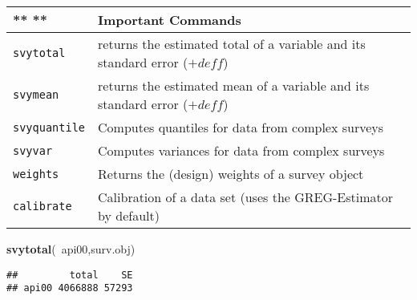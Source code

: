 \documentclass[]{article}
\newenvironment{Shaded}{\begin{snugshade}}{\end{snugshade}}
\newcommand{\KeywordTok}[1]{\textcolor[rgb]{0.13,0.29,0.53}{\textbf{{#1}}}}
\newcommand{\NormalTok}[1]{{#1}}
\begin{document}
\begin{longtable}[]{@{}ll@{}}
\toprule
\begin{minipage}[b]{0.13\columnwidth}\raggedright\strut
** **\strut
\end{minipage} & \begin{minipage}[b]{0.82\columnwidth}\raggedright\strut
\textbf{Important Commands}\strut
\end{minipage}\tabularnewline
\midrule
\endhead
\begin{minipage}[t]{0.13\columnwidth}\raggedright\strut
\texttt{svytotal}\strut
\end{minipage} & \begin{minipage}[t]{0.82\columnwidth}\raggedright\strut
returns the estimated total of a variable and its standard error
(\(+ deff\))\strut
\end{minipage}\tabularnewline
\begin{minipage}[t]{0.13\columnwidth}\raggedright\strut
\texttt{svymean}\strut
\end{minipage} & \begin{minipage}[t]{0.82\columnwidth}\raggedright\strut
returns the estimated mean of a variable and its standard error
(\(+ deff\))\strut
\end{minipage}\tabularnewline
\begin{minipage}[t]{0.13\columnwidth}\raggedright\strut
\texttt{svyquantile}\strut
\end{minipage} & \begin{minipage}[t]{0.82\columnwidth}\raggedright\strut
Computes quantiles for data from complex surveys\strut
\end{minipage}\tabularnewline
\begin{minipage}[t]{0.13\columnwidth}\raggedright\strut
\texttt{svyvar}\strut
\end{minipage} & \begin{minipage}[t]{0.82\columnwidth}\raggedright\strut
Computes variances for data from complex surveys\strut
\end{minipage}\tabularnewline
\begin{minipage}[t]{0.13\columnwidth}\raggedright\strut
\texttt{weights}\strut
\end{minipage} & \begin{minipage}[t]{0.82\columnwidth}\raggedright\strut
Returns the (design) weights of a survey object\strut
\end{minipage}\tabularnewline
\begin{minipage}[t]{0.13\columnwidth}\raggedright\strut
\texttt{calibrate}\strut
\end{minipage} & \begin{minipage}[t]{0.82\columnwidth}\raggedright\strut
Calibration of a data set (uses the GREG-Estimator by default)\strut
\end{minipage}\tabularnewline
\bottomrule
\end{longtable}

\begin{Shaded}
\begin{Highlighting}[]
\KeywordTok{svytotal}\NormalTok{(~api00,surv.obj)}
\end{Highlighting}
\end{Shaded}

\begin{verbatim}
##         total    SE
## api00 4066888 57293
\end{verbatim}
\end{document}
